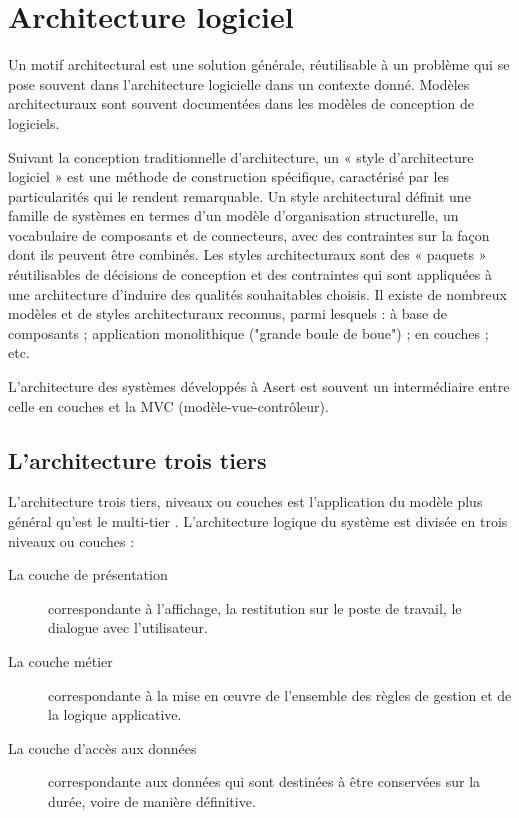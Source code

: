 
\section{Architecture logiciel}

Un motif architectural est une solution générale, réutilisable à un problème qui se pose souvent dans l'architecture logicielle dans un contexte donné. Modèles architecturaux sont souvent documentées dans les modèles de conception de logiciels. \cite{software-arch} 

Suivant la conception traditionnelle d'architecture, un « style d'architecture logiciel » est une méthode de construction spécifique, caractérisé par les particularités qui le rendent remarquable. Un style architectural définit une famille de systèmes en termes d'un modèle d'organisation structurelle, un vocabulaire de composants et de connecteurs, avec des contraintes sur la façon dont ils peuvent être combinés. Les styles architecturaux sont des « paquets » réutilisables de décisions de conception et des contraintes qui sont appliquées à une architecture d'induire des qualités souhaitables choisis. Il existe de nombreux modèles et de styles architecturaux reconnus, parmi lesquels : à base de composants ; application monolithique ("grande boule de boue") ; en couches ; etc. \cite{software-arch-patterns}

L'architecture des systèmes développés à Asert est souvent un intermédiaire entre celle en couches et la MVC (modèle-vue-contrôleur).

\subsection{L'architecture trois tiers}

L'architecture trois tiers, niveaux ou couches est l'application du modèle plus général qu'est le multi-tier \cite{n-tier}. L'architecture logique du système est divisée en trois niveaux ou couches : 
\begin{description}
\item[La couche de présentation] correspondante à l'affichage, la restitution sur le poste de travail, le dialogue avec l'utilisateur.
\item[La couche métier] correspondante à la mise en œuvre de l'ensemble des règles de gestion et de la logique applicative.
\item[La couche d'accès aux données] correspondante aux données qui sont destinées à être conservées sur la durée, voire de manière définitive.
\end{description}

